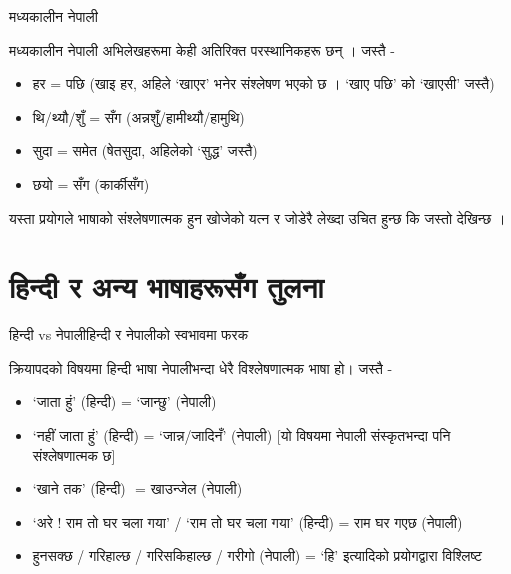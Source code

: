 \documentclass[aspectratio=169, 12pt]{beamer}
\begin{document}
\begin{frame}[fragile]{मध्यकालीन नेपाली}{}

मध्यकालीन नेपाली अभिलेखहरूमा केही अतिरिक्त परस्थानिकहरू छन् । जस्तै -

\begin{itemize}
\item हर = पछि (खाइ हर, अहिले  `खाएर' भनेर संश्लेषण भएको छ । `खाए पछि' को `खाएसी' जस्तै)


\item थि/थ्यौ/शुँ = सँग (अन्नशुँ/हामीथ्यौ/हामुथि)


\item सुदा = समेत (षेतसुदा, अहिलेको `सुद्ध' जस्तै)


\item छयो = सँग (कार्कीसँग)


\end{itemize}
यस्ता प्रयोगले भाषाको संश्लेषणात्मक हुन खोजेको यत्न र जोडेरै लेख्दा उचित हुन्छ कि जस्तो देखिन्छ ।

\end{frame}

\section{हिन्दी र अन्य भाषाहरूसँग तुलना}

\begin{frame}[fragile]{हिन्दी vs नेपाली}{हिन्दी र नेपालीको स्वभावमा फरक}

क्रियापदको विषयमा हिन्दी भाषा नेपालीभन्दा धेरै विश्लेषणात्मक भाषा हो। जस्तै -

\begin{itemize}
\item `जाता हुं' (हिन्दी) = `जान्छु' (नेपाली)


\item `नहीं जाता हुं' (हिन्दी) = `जान्न/जादिनँ' (नेपाली) [यो विषयमा नेपाली संस्कृतभन्दा पनि संश्लेषणात्मक छ]


\item `खाने तक' (हिन्दी) ‍ = खाउन्जेल (नेपाली)


\item `अरे ! राम तो घर चला गया' / `राम तो घर चला गया' (हिन्दी) = राम घर गएछ (नेपाली)


\item हुनसक्छ / गरिहाल्छ / गरिसकिहाल्छ / गरीगो (नेपाली) = `हि' इत्यादिको प्रयोगद्वारा विश्लिष्ट


\end{itemize}
\end{frame}
\end{document}
